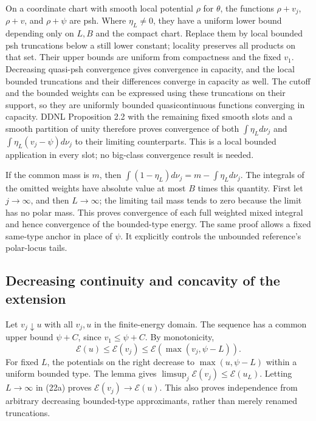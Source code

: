 \documentclass[
  11pt,
]{article}
\begin{document}
On a coordinate chart with smooth local potential \(\rho\) for
\(\theta\), the functions \(\rho+v_j\), \(\rho+v\), and \(\rho+\psi\)
are psh. Where \(\eta_L\ne0\), they have a uniform lower bound depending
only on \(L,B\) and the compact chart. Replace them by local bounded psh
truncations below a still lower constant; locality preserves all
products on that set. Their upper bounds are uniform from compactness
and the fixed \(v_1\). Decreasing quasi-psh convergence gives
convergence in capacity, and the local bounded truncations and their
differences converge in capacity as well. The cutoff and the bounded
weights can be expressed using these truncations on their support, so
they are uniformly bounded quasicontinuous functions converging in
capacity. DDNL Proposition 2.2 with the remaining fixed smooth slots and
a smooth partition of unity therefore proves convergence of both
\(\int\eta_Ld\nu_j\) and \(\int\eta_L(v_j-\psi)d\nu_j\) to their
limiting counterparts. This is a local bounded application in every
slot; no big-class convergence result is needed.

If the common mass is \(m\), then
\(\int(1-\eta_L)d\nu_j=m-\int\eta_Ld\nu_j\). The integrals of the
omitted weights have absolute value at most \(B\) times this quantity.
First let \(j\to\infty\), and then \(L\to\infty\); the limiting tail
mass tends to zero because the limit has no polar mass. This proves
convergence of each full weighted mixed integral and hence convergence
of the bounded-type energy. The same proof allows a fixed same-type
anchor in place of \(\psi\). It explicitly controls the unbounded
reference's polar-locus tails.

\subsection{Decreasing continuity and concavity of the
extension}\label{decreasing-continuity-and-concavity-of-the-extension}

Let \(v_j\downarrow u\) with all \(v_j,u\) in the finite-energy domain.
The sequence has a common upper bound \(\psi+C\), since
\(v_1\leq\psi+C\). By monotonicity, \[
\mathcal{E}(u)\leq\mathcal{E}(v_j)\leq\mathcal{E}(\max(v_j,\psi-L)).
\] For fixed \(L\), the potentials on the right decrease to
\(\max(u,\psi-L)\) within a uniform bounded type. The lemma gives
\(\limsup_j\mathcal{E}(v_j)\leq\mathcal{E}(u_L)\). Letting \(L\to\infty\)
in (22a) proves \(\mathcal{E}(v_j)\to\mathcal{E}(u)\). This also proves
independence from arbitrary decreasing bounded-type approximants, rather
than merely renamed truncations.
\end{document}
